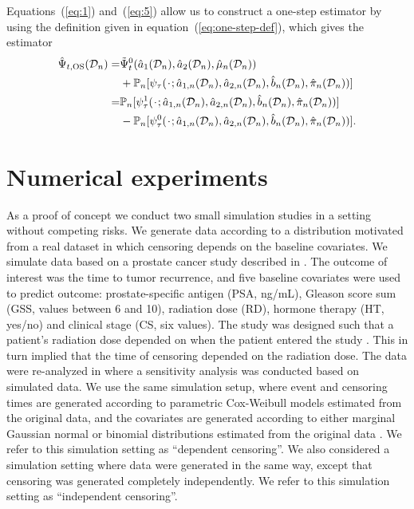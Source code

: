 \documentclass{statsoc}
\numberwithin{theorem}{section}
\newcommand{\blank}{\makebox[1ex]{\textbf{$\cdot$}}}
\newcommand{\1}{\mathds{1}}
\newcommand{\empmeas}{\ensuremath{\mathbb{P}_n}} %
\newcommand{\data}{\ensuremath{\mathcal{D}}}
\begin{document}
Equations~(\ref{eq:1}) and~(\ref{eq:5}) allow us to construct a one-step
estimator by using the definition given in equation~(\ref{eq:one-step-def}),
which gives the estimator
\begin{equation}
  \label{eq:one-step-comp-ate}
  \begin{split}
    \hat{\Psi}_{t,\text{OS}}(\data_n)
    = &
        \tilde{\Psi}_{t}^0(\hat{a}_1(\data_n), \hat{a}_2(\data_n),
        \hat{\mu}_n(\data_n))
    \\
      &
        +
        \empmeas{[\psi_{\tau}(\blank; \hat{a}_{1,n}(\data_n), \hat{a}_{2,n}(\data_n),
        \hat{b}_n(\data_n), \hat{\pi}_n(\data_n))]}
    \\
    = &
        \empmeas{[\psi_{\tau}^1(\blank; \hat{a}_{1,n}(\data_n), \hat{a}_{2,n}(\data_n),
        \hat{b}_n(\data_n), \hat{\pi}_n(\data_n))]}
    \\
      &
        - \empmeas{[\psi_{\tau}^0(\blank; \hat{a}_{1,n}(\data_n), \hat{a}_{2,n}(\data_n),
        \hat{b}_n(\data_n), \hat{\pi}_n(\data_n))]}.
  \end{split}
\end{equation}


\section{Numerical experiments}
\label{sec:numer-exper}

As a proof of concept we conduct two small simulation studies in a setting
without competing risks. We generate data according to a distribution motivated
from a real dataset in which censoring depends on the baseline covariates. We
simulate data based on a prostate cancer study described in
\citep{kattan2000pretreatment}. The outcome of interest was the time to tumor
recurrence, and five baseline covariates were used to predict outcome:
prostate-specific antigen (PSA, ng/mL), Gleason score sum (GSS, values between 6
and 10), radiation dose (RD), hormone therapy (HT, yes/no) and clinical stage
(CS, six values). The study was designed such that a patient's radiation dose
depended on when the patient entered the study \citep{gerds2013estimating}. This
in turn implied that the time of censoring depended on the radiation dose. The
data were re-analyzed in \citep{gerds2013estimating} where a sensitivity
analysis was conducted based on simulated data. We use the same simulation
setup, where event and censoring times are generated according to parametric
Cox-Weibull models estimated from the original data, and the covariates are
generated according to either marginal Gaussian normal or binomial distributions
estimated from the original data
\citep[c.f.,][Section~4.6]{gerds2013estimating}. We refer to this simulation
setting as ``dependent censoring''. We also considered a simulation setting
where data were generated in the same way, except that censoring was generated
completely independently. We refer to this simulation setting as ``independent
censoring''.
\end{document}
